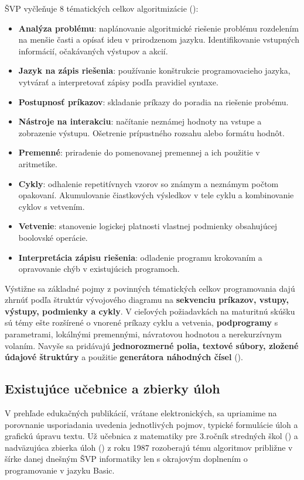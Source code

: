 ŠVP vyčleňuje 8 tématických celkov algoritmizácie (\cite{statny_2023}):
\begin{itemize}[noitemsep,topsep=0pt]
\item \textbf{Analýza problému}: naplánovanie algoritmické riešenie problému rozdelením na menšie časti a opísať ideu v prirodzenom jazyku. Identifikovanie vstupných informácií, očakávaných výstupov a akcií. 
\item \textbf{Jazyk na zápis riešenia}: používanie konštrukcie programovacieho jazyka, vytvárať a interpretovať zápisy podľa pravidiel syntaxe.
\item \textbf{Postupnosť príkazov}: skladanie príkazy do poradia na riešenie probému.
\item \textbf{Nástroje na interakciu}: načítanie neznámej hodnoty na vstupe a zobrazenie výstupu. Ošetrenie prípustného rozsahu alebo formátu hodnôt.
\item \textbf{Premenné}: priradenie do pomenovanej premennej a ich použitie v aritmetike.
\item \textbf{Cykly}: odhalenie repetitívnych vzorov so známym a neznámym počtom opakovaní. Akumulovanie čiastkových výsledkov v tele cyklu a kombinovanie cyklov s vetvením.
\item \textbf{Vetvenie}: stanovenie logickej platnosti vlastnej podmienky obsahujúcej boolovské operácie.
\item \textbf{Interpretácia zápisu riešenia}: odladenie programu krokovaním a opravovanie chýb v existujúcich programoch.
\end{itemize}

Výstižne sa základné pojmy z povinných tématických celkov programovania dajú zhrnúť podľa štruktúr vývojového diagramu na \textbf{sekvenciu príkazov, vstupy, výstupy, podmienky a cykly}. V cieľových požiadavkách na maturitnú skúšku sú témy ešte rozšírené o vnorené príkazy cyklu a vetvenia, \textbf{podprogramy} s parametrami, lokálnými premennými, návratovou hodnotou a nerekurzívnym volaním. Navyše sa pridávajú \textbf{jednorozmerné polia, textové súbory, zložené údajové štruktúry} a použitie \textbf{generátora náhodných čísel} (\cite{cp_2023}).

\subsection{Existujúce učebnice a zbierky úloh}
V prehľade edukačných publikácií, vrátane elektronických, sa upriamime na porovnanie usporiadania uvedenia jednotlivých pojmov, typické formulácie úloh a grafickú úpravu textu. Už učebnica z matematiky pre 3.ročník stredných škol (\cite{sedivy_matematika_1986}) a nadväzujúca zbierka úloh (\cite{busek_zbierka_1987}) z roku 1987 rozoberajú tému algoritmov približne v šírke danej dnešným ŠVP informatiky len s okrajovým doplnením o programovanie v jazyku Basic. 

